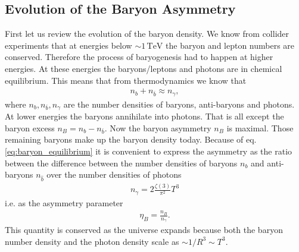 \documentclass[13pt,a4paper,titlepage]{article}
\begin{document}
\subsection{Evolution of the Baryon Asymmetry}
\label{sec:evolution_of_the_baryon_asymmetry}
First let us review the evolution of the baryon density. We know from collider experiments that at energies below $\sim 1 \, \mathrm{TeV}$ the baryon and lepton numbers are conserved.
Therefore the process of baryogenesis had to happen at higher energies.
At these energies the baryons/leptons and photons are in chemical equilibrium.
This means that from thermodynamics we know that
\begin{align}
\label{eq:baryon_equilibrium}
n_b + n_{\bar{b}} \approx n_\gamma,
\end{align}
where $n_b, n_{\bar{b}}, n_\gamma$ are the number densities of baryons, anti-baryons and photons.
At lower energies the baryons annihilate into photons. That is all except the baryon excess $n_B = n_b - n_{\bar{b}}$. Now the baryon asymmetry $n_B$ is maximal. Those remaining baryons make up the baryon density today.
Because of eq. \eqref{eq:baryon_equilibrium} it is convenient to express the asymmetry as
the ratio between the difference between the number densities of baryons $n_b$ and anti-baryons $n_{\hat{b}}$
over the number densities of photons \cite[eq. 3.52]{the_early_universe_kolb_and_turner}
\begin{align}
    n_\gamma = 2 \frac{\zeta(3)}{\pi^2} T^3
\end{align}
i.e. as the asymmetry parameter \cite[eq. 1.2]{Cline:2006ts_Baryogenesis}
\begin{align}
    \eta_B = \frac{n_B}{n_\gamma}.
\end{align}
This quantity is conserved as the universe expands because both the baryon number density
and the photon density scale as $\sim 1/R^3 \sim T^3$.
\end{document}
